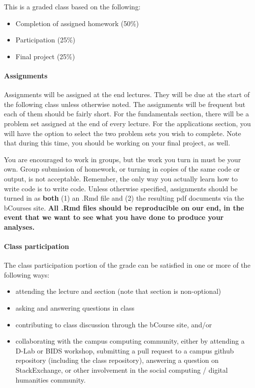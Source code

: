 \documentclass[
]{article}
\begin{document}
This is a graded class based on the following:

\begin{itemize}
\item
  Completion of assigned homework (50\%)
\item
  Participation (25\%)
\item
  Final project (25\%)
\end{itemize}

\hypertarget{assignments}{%
\paragraph{Assignments}\label{assignments}}

Assignments will be assigned at the end lectures. They will be due at
the start of the following class unless otherwise noted. The assignments
will be frequent but each of them should be fairly short. For the
fundamentals section, there will be a problem set assigned at the end of
every lecture. For the applications section, you will have the option to
select the two problem sets you wish to complete. Note that during this
time, you should be working on your final project, as well.

You are encouraged to work in groups, but the work you turn in must be
your own. Group submission of homework, or turning in copies of the same
code or output, is not acceptable. Remember, the only way you actually
learn how to write code is to write code. Unless otherwise specified,
assignments should be turned in as \textbf{both} (1) an .Rmd file and
(2) the resulting pdf documents via the bCourses site. \textbf{All .Rmd
files should be reproducible on our end, in the event that we want to
see what you have done to produce your analyses.}

\hypertarget{class-participation}{%
\paragraph{Class participation}\label{class-participation}}

The class participation portion of the grade can be satisfied in one or
more of the following ways:

\begin{itemize}
\item
  attending the lecture and section (note that section is non-optional)
\item
  asking and answering questions in class
\item
  contributing to class discussion through the bCourse site, and/or
\item
  collaborating with the campus computing community, either by attending
  a D-Lab or BIDS workshop, submitting a pull request to a campus github
  repository (including the class repository), answering a question on
  StackExchange, or other involvement in the social computing / digital
  humanities community.
\end{itemize}
\end{document}
